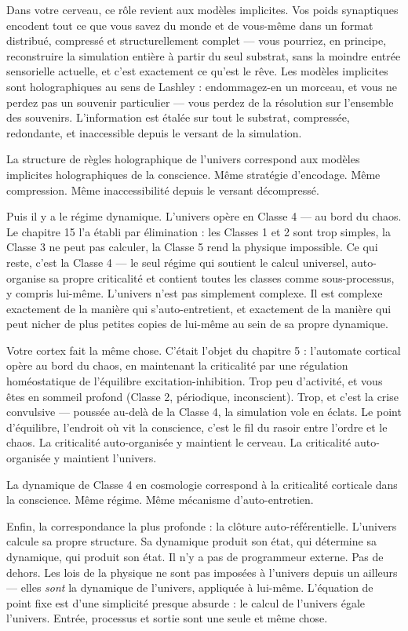 \documentclass[11pt, twoside, openright]{book}
\begin{document}
Dans votre cerveau, ce rôle revient aux modèles implicites. Vos poids synaptiques encodent tout ce que vous savez du monde et de vous-même dans un format distribué, compressé et structurellement complet --- vous pourriez, en principe, reconstruire la simulation entière à partir du seul substrat, sans la moindre entrée sensorielle actuelle, et c'est exactement ce qu'est le rêve. Les modèles implicites sont holographiques au sens de Lashley : endommagez-en un morceau, et vous ne perdez pas un souvenir particulier --- vous perdez de la résolution sur l'ensemble des souvenirs. L'information est étalée sur tout le substrat, compressée, redondante, et inaccessible depuis le versant de la simulation.

La structure de règles holographique de l'univers correspond aux modèles implicites holographiques de la conscience. Même stratégie d'encodage. Même compression. Même inaccessibilité depuis le versant décompressé.

Puis il y a le régime dynamique. L'univers opère en Classe 4 --- au bord du chaos. Le chapitre 15 l'a établi par élimination : les Classes 1 et 2 sont trop simples, la Classe 3 ne peut pas calculer, la Classe 5 rend la physique impossible. Ce qui reste, c'est la Classe 4 --- le seul régime qui soutient le calcul universel, auto-organise sa propre criticalité et contient toutes les classes comme sous-processus, y compris lui-même. L'univers n'est pas simplement complexe. Il est complexe exactement de la manière qui s'auto-entretient, et exactement de la manière qui peut nicher de plus petites copies de lui-même au sein de sa propre dynamique.

Votre cortex fait la même chose. C'était l'objet du chapitre 5 : l'automate cortical opère au bord du chaos, en maintenant la criticalité par une régulation homéostatique de l'équilibre excitation-inhibition. Trop peu d'activité, et vous êtes en sommeil profond (Classe 2, périodique, inconscient). Trop, et c'est la crise convulsive --- poussée au-delà de la Classe 4, la simulation vole en éclats. Le point d'équilibre, l'endroit où vit la conscience, c'est le fil du rasoir entre l'ordre et le chaos. La criticalité auto-organisée y maintient le cerveau. La criticalité auto-organisée y maintient l'univers.

La dynamique de Classe 4 en cosmologie correspond à la criticalité corticale dans la conscience. Même régime. Même mécanisme d'auto-entretien.

Enfin, la correspondance la plus profonde : la clôture auto-référentielle. L'univers calcule sa propre structure. Sa dynamique produit son état, qui détermine sa dynamique, qui produit son état. Il n'y a pas de programmeur externe. Pas de dehors. Les lois de la physique ne sont pas imposées à l'univers depuis un ailleurs --- elles \textit{sont} la dynamique de l'univers, appliquée à lui-même. L'équation de point fixe est d'une simplicité presque absurde : le calcul de l'univers égale l'univers. Entrée, processus et sortie sont une seule et même chose.
\end{document}

